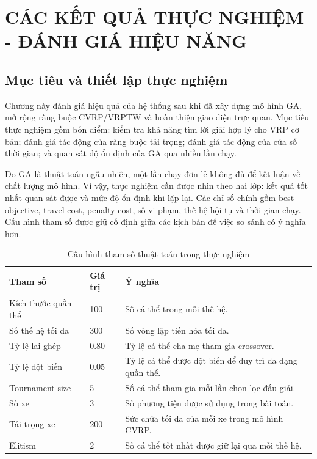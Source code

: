 \documentclass[12pt,a4paper]{article}
\numberwithin{figure}{subsection}
\numberwithin{table}{subsection}
\begin{document}
\section{CÁC KẾT QUẢ THỰC NGHIỆM - ĐÁNH GIÁ HIỆU NĂNG}

\subsection{Mục tiêu và thiết lập thực nghiệm}

Chương này đánh giá hiệu quả của hệ thống sau khi đã xây dựng mô hình GA, mở rộng ràng buộc CVRP/VRPTW và hoàn thiện giao diện trực quan. Mục tiêu thực nghiệm gồm bốn điểm: kiểm tra khả năng tìm lời giải hợp lý cho VRP cơ bản; đánh giá tác động của ràng buộc tải trọng; đánh giá tác động của cửa sổ thời gian; và quan sát độ ổn định của GA qua nhiều lần chạy.

Do GA là thuật toán ngẫu nhiên, một lần chạy đơn lẻ không đủ để kết luận về chất lượng mô hình. Vì vậy, thực nghiệm cần được nhìn theo hai lớp: kết quả tốt nhất quan sát được và mức độ ổn định khi lặp lại. Các chỉ số chính gồm best objective, travel cost, penalty cost, số vi phạm, thế hệ hội tụ và thời gian chạy. Cấu hình tham số được giữ cố định giữa các kịch bản để việc so sánh có ý nghĩa hơn.

\begin{table}[htbp]
    \centering
    \caption{Cấu hình tham số thuật toán trong thực nghiệm}
    \label{tab:experiment_config}
    \renewcommand{\arraystretch}{1.24}
    \begin{tabular}{|p{5cm}|p{3cm}|p{6cm}|}
        \hline
        \textbf{Tham số} & \textbf{Giá trị} & \textbf{Ý nghĩa} \\
        \hline
        Kích thước quần thể & 100 & Số cá thể trong mỗi thế hệ. \\
        \hline
        Số thế hệ tối đa & 300 & Số vòng lặp tiến hóa tối đa. \\
        \hline
        Tỷ lệ lai ghép & 0.80 & Tỷ lệ cá thể cha mẹ tham gia crossover. \\
        \hline
        Tỷ lệ đột biến & 0.05 & Tỷ lệ cá thể được đột biến để duy trì đa dạng quần thể. \\
        \hline
        Tournament size & 5 & Số cá thể tham gia mỗi lần chọn lọc đấu giải. \\
        \hline
        Số xe & 3 & Số phương tiện được sử dụng trong bài toán. \\
        \hline
        Tải trọng xe & 200 & Sức chứa tối đa của mỗi xe trong mô hình CVRP. \\
        \hline
        Elitism & 2 & Số cá thể tốt nhất được giữ lại qua mỗi thế hệ. \\
        \hline
    \end{tabular}
\end{table}
\end{document}

